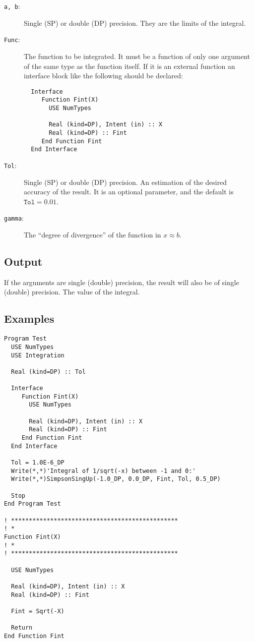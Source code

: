 \begin{description}
\item[\texttt{a, b}:] Single (SP) or double (DP) precision. They are
  the limits of the integral.
\item[\texttt{Func}:] The function to be integrated. It must be a
  function of only one argument of the same type as the function
  itself. If it is an
  external function an interface block like the following should be
  declared: 
\begin{verbatim}
  Interface 
     Function Fint(X)
       USE NumTypes

       Real (kind=DP), Intent (in) :: X
       Real (kind=DP) :: Fint
     End Function Fint
  End Interface
\end{verbatim}
\item[\texttt{Tol}:] Single (SP) or double (DP) precision. An
  estimation of the desired accuracy of the result. It is an optional
  parameter, and the default is $\mathtt{Tol} = 0.01$. 
\item[\texttt{gamma}:] The ``degree of divergence'' of the function in
  $x\approx b$. 
\end{description}


\subsection{Output}

If the arguments are single (double) precision, the result will also be of
single (double) precision. The value of the integral.


\subsection{Examples}

\begin{verbatim}
Program Test
  USE NumTypes
  USE Integration

  Real (kind=DP) :: Tol

  Interface 
     Function Fint(X)
       USE NumTypes

       Real (kind=DP), Intent (in) :: X
       Real (kind=DP) :: Fint
     End Function Fint
  End Interface

  Tol = 1.0E-6_DP
  Write(*,*)'Integral of 1/sqrt(-x) between -1 and 0:'
  Write(*,*)SimpsonSingUp(-1.0_DP, 0.0_DP, Fint, Tol, 0.5_DP)

  Stop
End Program Test

! ***********************************************
! *
Function Fint(X)
! *  
! ***********************************************

  USE NumTypes

  Real (kind=DP), Intent (in) :: X
  Real (kind=DP) :: Fint

  Fint = Sqrt(-X)

  Return
End Function Fint
\end{verbatim}

